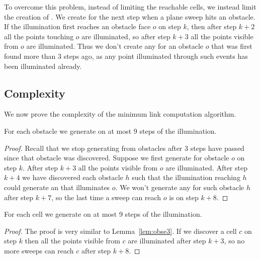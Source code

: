 \documentclass[english,gradu]{tktltiki2018}
\begin{document}
To overcome this problem, instead of limiting the reachable cells, we instead limit the creation of \addEs.
We create \addEs for the next step when a plane sweep hits an obstacle.
If the illumination first reaches an obstacle face $o$ on step $k$, then after step $k+2$ all the points touching $o$ are illuminated, so after step $k+3$ all the points visible from $o$ are illuminated.
Thus we don't create any \addEs for an obstacle $o$ that was first found more than 3 steps ago, as any point illuminated through such events has been illuminated already.

\subsection{Complexity}

We now prove the complexity of the minimum link computation algorithm.

\begin{lem}\label{lem:obse3}For each obstacle we generate \obsE on at most 9 steps of the illumination.\end{lem}
\begin{proof}
Recall that we stop generating \addEs from obstacles after 3 steps have passed since that obstacle was discovered.
Suppose we first generate \obsE for obstacle $o$ on step $k$.
After step $k+3$ all the points visible from $o$ are illuminated.
After step $k+4$ we have discovered each obstacle $h$ such that the illumination reaching $h$ could generate an \addE that illuminates $o$.
We won't generate any \addEs for such obstacle $h$ after step $k+7$, so the last time a sweep can reach $o$ is on step $k+8$.
\end{proof}

\begin{lem}\label{lem:celle3}For each cell we generate \cellE on at most 9 steps of the illumination.\end{lem}
\begin{proof}
The proof is very similar to Lemma~\ref{lem:obse3}.
If we discover a cell $c$ on step $k$ then all the points visible from $c$ are illuminated after step $k+3$, so no more sweeps can reach $c$ after step $k+8$.
\end{proof}
\end{document}
